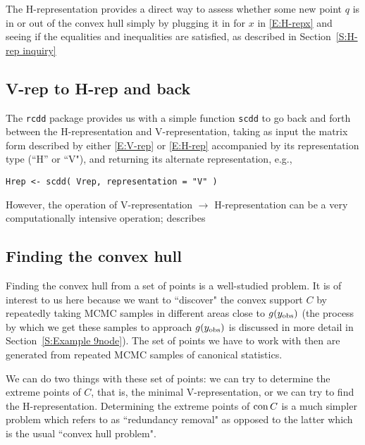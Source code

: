 The H-representation provides a direct
way to assess whether some new point $q$ is in or out of the convex hull
simply by plugging it in for $x$ in \eqref{E:H-repx} and seeing if the equalities
and inequalities are satisfied, as described in Section~\ref{S:H-rep inquiry}

\subsection{V-rep to H-rep and back}
The \texttt{rcdd} package provides us with a simple function \texttt{scdd}
to go back and forth between the H-representation and V-representation, taking as input
the matrix form described by either \eqref{E:V-rep} or \eqref{E:H-rep} accompanied
by its representation type (``H'' or ``V"), and returning its alternate representation, e.g.,
\begin{verbatim}
Hrep <- scdd( Vrep, representation = "V" )
\end{verbatim}

However, the operation of V-representation $\rightarrow$ H-representation 
can be a very computationally intensive operation; \citet{Geyer:2009} describes


\subsection{Finding the convex hull}
Finding the convex hull from a set of points is a well-studied problem.  It 
is of interest to us here because we want to ``discover" the convex support $C$
by repeatedly taking MCMC samples in different areas close to $g(y_{\text{obs}})$ (the
process by which we get these samples to approach $g(y_{\text{obs}})$ is discussed
in more detail in Section~\ref{S:Example 9node}).  The 
set of points we have to work with then are generated from repeated MCMC
samples of canonical statistics.

We can do two things with these set of points: we can try to determine the
extreme points of $C$, that is, the minimal V-representation, or we can try to find
the H-representation.  Determining the extreme points of $\operatorname{con} C$ 
is a much simpler problem which \citet{Fukuda:2004} refers to as ``redundancy 
removal" as opposed to the latter which is the usual ``convex hull problem".

